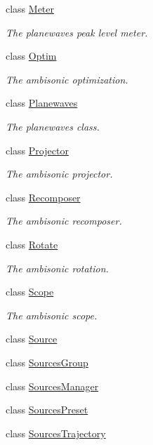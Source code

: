 \begin{DoxyCompactItemize}
class \hyperlink{class_hoa2_d_1_1_meter}{Meter}
\begin{DoxyCompactList}\small\item\em The planewaves peak level meter. \end{DoxyCompactList}\item 
class \hyperlink{class_hoa2_d_1_1_optim}{Optim}
\begin{DoxyCompactList}\small\item\em The ambisonic optimization. \end{DoxyCompactList}\item 
class \hyperlink{class_hoa2_d_1_1_planewaves}{Planewaves}
\begin{DoxyCompactList}\small\item\em The planewaves class. \end{DoxyCompactList}\item 
class \hyperlink{class_hoa2_d_1_1_projector}{Projector}
\begin{DoxyCompactList}\small\item\em The ambisonic projector. \end{DoxyCompactList}\item 
class \hyperlink{class_hoa2_d_1_1_recomposer}{Recomposer}
\begin{DoxyCompactList}\small\item\em The ambisonic recomposer. \end{DoxyCompactList}\item 
class \hyperlink{class_hoa2_d_1_1_rotate}{Rotate}
\begin{DoxyCompactList}\small\item\em The ambisonic rotation. \end{DoxyCompactList}\item 
class \hyperlink{class_hoa2_d_1_1_scope}{Scope}
\begin{DoxyCompactList}\small\item\em The ambisonic scope. \end{DoxyCompactList}\item 
class \hyperlink{class_hoa2_d_1_1_source}{Source}
\item 
class \hyperlink{class_hoa2_d_1_1_sources_group}{Sources\-Group}
\item 
class \hyperlink{class_hoa2_d_1_1_sources_manager}{Sources\-Manager}
\item 
class \hyperlink{class_hoa2_d_1_1_sources_preset}{Sources\-Preset}
\item 
class \hyperlink{class_hoa2_d_1_1_sources_trajectory}{Sources\-Trajectory}

\end{DoxyCompactItemize}
